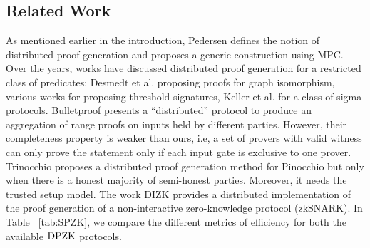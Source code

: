 \subsection{Related Work}\label{sec:relatedwork}
As mentioned earlier in the introduction, Pedersen \cite{Ped92} defines the
notion of distributed proof generation and proposes a generic construction using
MPC. Over the years, works have discussed distributed proof generation for a
restricted class of predicates: Desmedt et al. \cite{DDB94} proposing proofs for
graph isomorphism, various works \cite{King05, DDS, Desmedt2011} for proposing
threshold signatures, Keller et al. \cite{EfficientTZ} for a class of sigma
protocols. Bulletproof  \cite{bulletproofs} presents a
``distributed'' protocol to produce an aggregation of range proofs on inputs
held by different parties. However, their completeness property is weaker than
ours, i.e, a set of provers with valid witness can only prove the statement only if each input gate is exclusive to one prover. 
Trinocchio \cite{trinocchio} proposes a distributed proof generation method for
Pinocchio  \cite{pinnochio_PHGR} but only when there is a
honest majority of semi-honest parties. Moreover, it needs the trusted setup
model. The work DIZK \cite{dizk} provides a distributed implementation of the proof generation of a non-interactive zero-knowledge protocol (zkSNARK).
In Table ~\ref{tab:SPZK}, we compare the different metrics of efficiency for both the available $\text{DPZK}$ protocols. 
